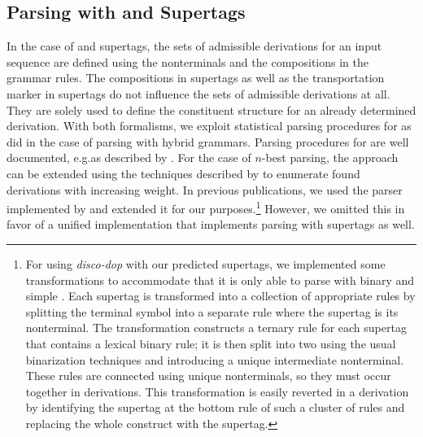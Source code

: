 \documentclass[../../document.tex]{subfiles}
\begin{document}
    \subsection{Parsing with  and  Supertags}\label{sec:parsing:lcfrs}
    In the case of  and  supertags, the sets of admissible derivations for an input sequence are defined using the nonterminals and the  compositions in the grammar rules.
    The  compositions in  supertags as well as the transportation marker in  supertags do not influence the sets of admissible derivations at all.
    They are solely used to define the constituent structure for an already determined derivation.
    With both formalisms, we exploit statistical parsing procedures for  as \citet{Geb20} did in the case of parsing with hybrid grammars.
    Parsing procedures for  are well documented, e.g.\@ as described by \citet[Section~7.1]{Kal10}.
    For the case of \(n\)-best parsing, the approach can be extended using the techniques described by \citet{HuaChia05} to enumerate found derivations with increasing weight.
    In previous publications, we used the  parser implemented by \citet{CraSchBod16} and extended it for our purposes.\footnote{
        For using \emph{disco-dop} with our predicted supertags, we implemented some transformations to accommodate that it is only able to parse with binary and simple .
        Each supertag is transformed into a collection of appropriate rules by splitting the terminal symbol into a separate rule where the supertag is its  nonterminal.
        The transformation constructs a ternary rule for each supertag that contains a lexical binary rule; it is then split into two using the usual binarization techniques and introducing a unique intermediate nonterminal.
        These rules are connected using unique nonterminals, so they must occur together in derivations.
        This transformation is easily reverted in a derivation by identifying the supertag at the bottom rule of such a cluster of rules and replacing the whole construct with the supertag.
    }
    However, we omitted this in favor of a unified implementation that implements parsing with  supertags as well.
\end{document}
